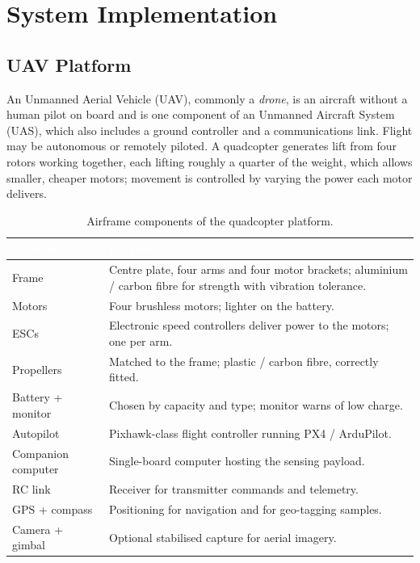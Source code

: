 
\chapter{System Implementation}
\label{ch:impl}

\section{UAV Platform}
An Unmanned Aerial Vehicle (UAV), commonly a \emph{drone}, is an aircraft without
a human pilot on board and is one component of an Unmanned Aircraft System (UAS),
which also includes a ground controller and a communications link. Flight may be
autonomous or remotely piloted. A quadcopter generates lift from four rotors
working together, each lifting roughly a quarter of the weight, which allows
smaller, cheaper motors; movement is controlled by varying the power each motor
delivers.

\begin{table}[H]
\centering
\caption{Airframe components of the quadcopter platform.}
\label{tab:parts}
\begin{tabularx}{\textwidth}{@{}l X@{}}
\toprule
\rowcolor{navy}
\textcolor{white}{\textbf{Component}} & \textcolor{white}{\textbf{Purpose}}\\
\midrule
Frame & Centre plate, four arms and four motor brackets; aluminium / carbon fibre for strength with vibration tolerance. \\
Motors & Four brushless motors; lighter on the battery. \\
ESCs & Electronic speed controllers deliver power to the motors; one per arm. \\
Propellers & Matched to the frame; plastic / carbon fibre, correctly fitted. \\
Battery + monitor & Chosen by capacity and type; monitor warns of low charge. \\
Autopilot & Pixhawk-class flight controller running PX4 / ArduPilot. \\
Companion computer & Single-board computer hosting the sensing payload. \\
RC link & Receiver for transmitter commands and telemetry. \\
GPS + compass & Positioning for navigation and for geo-tagging samples. \\
Camera + gimbal & Optional stabilised capture for aerial imagery. \\
\bottomrule
\end{tabularx}
\end{table}

